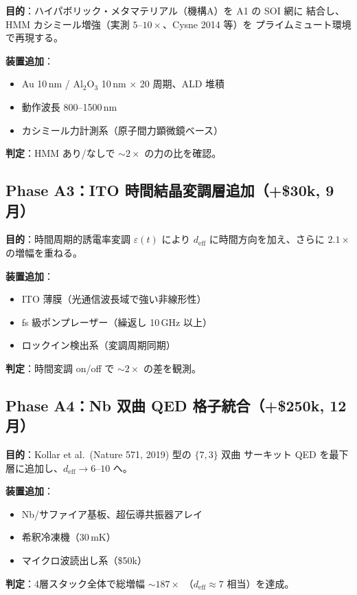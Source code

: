 \documentclass[11pt,a4paper]{article}
\begin{document}
\textbf{目的}：ハイパボリック・メタマテリアル（機構A）を A1 の SOI 網に
結合し、HMM カシミール増強（実測 $5$--$10\times$、Cysne 2014 等）を
プライムミュート環境で再現する。

\textbf{装置追加}：
\begin{itemize}
\item Au 10\,nm / Al$_2$O$_3$ 10\,nm × 20 周期、ALD 堆積
\item 動作波長 800--1500\,nm
\item カシミール力計測系（原子間力顕微鏡ベース）
\end{itemize}

\textbf{判定}：HMM あり/なしで $\sim 2\times$ の力の比を確認。

\subsection{Phase A3：ITO 時間結晶変調層追加（+\$30k, 9月）}

\textbf{目的}：時間周期的誘電率変調 $\varepsilon(t)$ により
$d_{\mathrm{eff}}$ に時間方向を加え、さらに $2.1\times$ の増幅を重ねる。

\textbf{装置追加}：
\begin{itemize}
\item ITO 薄膜（光通信波長域で強い非線形性）
\item fs 級ポンプレーザー（繰返し 10\,GHz 以上）
\item ロックイン検出系（変調周期同期）
\end{itemize}

\textbf{判定}：時間変調 on/off で $\sim 2\times$ の差を観測。

\subsection{Phase A4：Nb 双曲 QED 格子統合（+\$250k, 12月）}

\textbf{目的}：Kollar et al.\ (Nature 571, 2019) 型の $\{7,3\}$ 双曲
サーキット QED を最下層に追加し、$d_{\mathrm{eff}} \to 6$--$10$ へ。

\textbf{装置追加}：
\begin{itemize}
\item Nb/サファイア基板、超伝導共振器アレイ
\item 希釈冷凍機（30\,mK）
\item マイクロ波読出し系（\$50k）
\end{itemize}

\textbf{判定}：4層スタック全体で総増幅 $\sim 187\times$
（$d_{\mathrm{eff}} \approx 7$ 相当）を達成。
\end{document}
